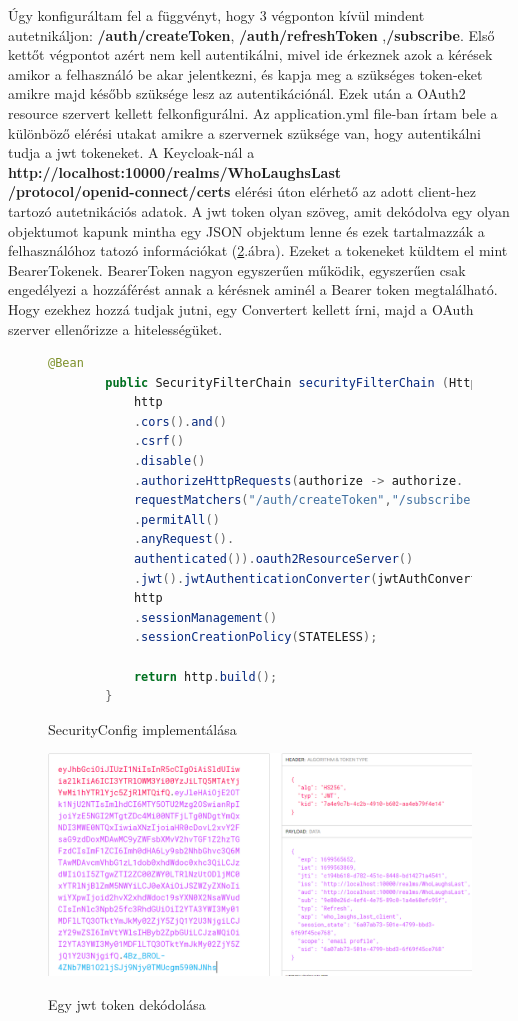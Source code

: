\documentclass[a4paper,twoside]{article}
\begin{document}
Úgy konfiguráltam fel a függvényt, hogy 3 végponton kívül mindent autetnikáljon: \textbf{/auth/createToken}, \textbf{/auth/refreshToken} ,\textbf{/subscribe}. Első kettőt végpontot azért nem kell autentikálni, mivel ide érkeznek azok a kérések amikor a felhasználó be akar jelentkezni, és kapja meg a szükséges token-eket amikre majd később szüksége lesz az autentikációnál. Ezek után a OAuth2 resource szervert kellett felkonfigurálni. Az application.yml file-ban írtam bele a különböző elérési utakat amikre a szervernek szüksége van, hogy autentikálni tudja a jwt tokeneket. A Keycloak-nál a \textbf{http://localhost:10000/realms/WhoLaughsLast\\/protocol/openid-connect/certs} elérési úton 
elérhető az adott client-hez tartozó autetnikációs adatok. A jwt token olyan szöveg, amit dekódolva egy olyan objektumot kapunk mintha egy JSON objektum lenne és ezek tartalmazzák a felhasználóhoz tatozó információkat (\ref{jwt}.ábra). Ezeket a tokeneket küldtem el mint BearerTokenek. BearerToken nagyon egyszerűen működik, egyszerűen csak engedélyezi a hozzáférést annak a kérésnek aminél a Bearer token megtalálható. Hogy ezekhez hozzá tudjak jutni,
egy Convertert kellett írni, majd a OAuth szerver ellenőrizze a hitelességüket. 

\begin{figure}
	\caption{SecurityConfig implementálása}
	
	\begin{lstlisting}[language=java,breaklines=true]
		@Bean
		public SecurityFilterChain securityFilterChain (HttpSecurity http) throws Exception{
			http
			.cors().and()
			.csrf()
			.disable()
			.authorizeHttpRequests(authorize -> authorize.
			requestMatchers("/auth/createToken","/subscribe","/auth/refreshToken")
			.permitAll()
			.anyRequest().
			authenticated()).oauth2ResourceServer()
			.jwt().jwtAuthenticationConverter(jwtAuthConverter);
			http
			.sessionManagement()
			.sessionCreationPolicy(STATELESS);
			
			return http.build();
		}
	\end{lstlisting}
	\label{secConf}
\end{figure}





\begin{figure}
	\caption{Egy jwt token dekódolása}
	\centering
	\includegraphics[scale=0.35]{jwt}
	\label{jwt}
\end{figure}
\FloatBarrier
\end{document}
